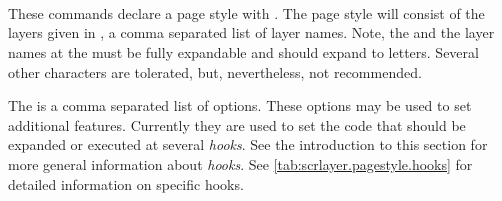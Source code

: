 \begin{Declaration}
  \\
  \\
  \\
\end{Declaration}
%
%
%
%
These commands declare a page style with . The page
style will consist of the layers given in , a comma
separated list of layer names. Note, the  and the
layer names at the  must be fully expandable and should
expand to letters. Several other characters are tolerated, but,
nevertheless, not recommended.

The  is a comma separated list of
 options. These options may be used to
set additional features. Currently they are used to set the code that should
be expanded or executed at several \emph{hooks}. See the introduction to this
section for more general information about \emph{hooks}. See
\autoref{tab:scrlayer.pagestyle.hooks} for detailed information on specific
hooks.

